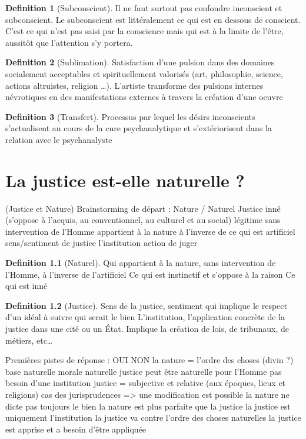 \documentclass[french]{book}
\theoremstyle{definition}
\newtheorem*{dfn}{Definition}
\begin{document}
\begin{dfn}[Subconscient]
Il ne faut surtout pas confondre inconscient et subconscient. Le subconscient est littéralement ce qui est en dessous de conscient. C’est ce qui n’est pas saisi par la conscience mais qui est à la limite de l’être, aussitôt que l’attention s’y portera.
\end{dfn}

\begin{dfn}[Sublimation]
Satisfaction d’une pulsion dans des domaines socialement acceptables et spirituellement valorisés (art, philosophie, science, actions altruistes, religion …). L’artiste transforme des pulsions internes névrotiques en des manifestations externes à travers la création d’une oeuvre
\end{dfn}

\begin{dfn}[Transfert]
Processus par lequel les désirs inconscients s’actualisent au cours de la cure psychanalytique et s'extériorisent dans la relation avec le psychanalyste
\end{dfn}

\chapter{La justice est-elle naturelle ?}
(Justice et Nature)
Brainstorming de départ :
Nature / Naturel
Justice
inné (s’oppose à l'acquis, au conventionnel, au culturel et au social)
légitime
sans intervention de l’Homme
appartient à la nature à l’inverse de ce qui est artificiel
sens/sentiment de justice
l’institution
action de juger


\begin{dfn}[Naturel]
Qui appartient à la nature, sans intervention de l’Homme, à l'inverse de l’artificiel
Ce qui est instinctif et s’oppose à la raison
Ce qui est inné
\end{dfn}


\begin{dfn}[Justice]
Sens de la justice, sentiment qui implique le respect d’un idéal à suivre qui serait le bien
L’institution, l’application concrète de la justice dans une cité ou un État. Implique la création de lois, de tribunaux, de métiers, etc…
\end{dfn}

Premières pistes de réponse :
OUI
NON
la nature = l'ordre des choses (divin ?)
base naturelle
morale naturelle
justice peut être naturelle pour l’Homme
pas besoin d’une institution
justice = subjective et relative (aux époques, lieux et religions)
cas des jurisprudences => une modification est possible
la nature ne dicte pas toujours le bien
la nature est plus parfaite que la justice
la justice est uniquement l’institution
la justice va contre l’ordre des choses naturelles
la justice est apprise et a besoin d’être appliquée
\end{document}
